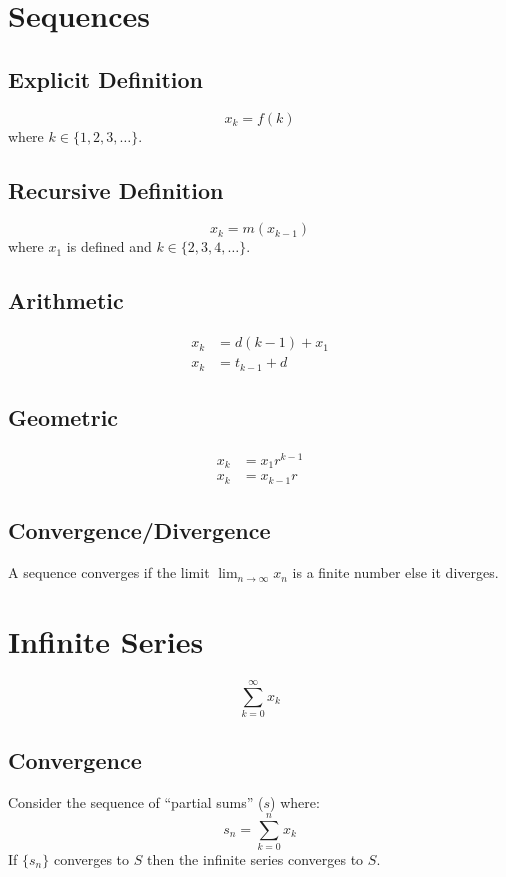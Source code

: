 \documentclass[12pt]{article}
\newcommand*{\fixmath}{\makebox{}\vspace{\glueexpr-\baselineskip-\abovedisplayskip}}
\newcommand*{\isum}[1][k]{\sum_{#1=0}^\infty}
\newenvironment{rmaskip}{\setlength{\abovedisplayskip}{0pt}\fixmath%
  \ignorespaces}{\ignorespacesafterend}
\newenvironment{rmskip}{\setlength{\abovedisplayskip}{0pt}%
  \setlength{\belowdisplayskip}{0pt}\fixmath\ignorespaces}%
  {\ignorespacesafterend}
\begin{document}
\section*{Sequences}
\subsection*{Explicit Definition}
\begin{rmaskip}
  \[
    x_k = f(k)
  \]
\end{rmaskip}
where \(k \in \{1,2,3,\dots\}\).
\subsection*{Recursive Definition}
\begin{rmaskip}
  \[
    x_k = m(x_{k-1})
  \]
\end{rmaskip}
where \(x_1\) is defined and \(k \in \{2,3,4,\dots\}\).
\subsection*{Arithmetic}
\begin{rmskip}
  \begin{align*}
    x_k &= d(k-1) + x_1\\
    x_k &= t_{k-1} + d
  \end{align*}
\end{rmskip}
\subsection*{Geometric}
\begin{rmskip}
  \begin{align*}
    x_k &= x_1r^{k-1}\\
    x_k &= x_{k-1} r
  \end{align*}
\end{rmskip}
\subsection*{Convergence\slash Divergence}
A sequence converges if the limit \(\displaystyle\lim_{n \to \infty} x_n\) is
a finite number else it diverges.
\section*{Infinite Series}
\begin{rmskip}
  \[
    \isum x_k
  \]
\end{rmskip}
\subsection*{Convergence}
Consider the sequence of ``partial sums'' (\(s\)) where:
\[
  s_n = \sum_{k=0}^n x_k
\]
If \(\{s_n\}\) converges to \(S\) then the infinite series converges to \(S\).
\end{document}
